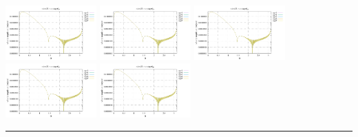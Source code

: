 \noindent
\includegraphics[width=3.5cm]{python_codes/fieldstone_152/RESULTS/exp2/vel_64_m2}
\includegraphics[width=3.5cm]{python_codes/fieldstone_152/RESULTS/exp2/vel_64_m3}
\includegraphics[width=3.5cm]{python_codes/fieldstone_152/RESULTS/exp2/vel_64_m4}
\includegraphics[width=3.5cm]{python_codes/fieldstone_152/RESULTS/exp2/vel_64_m5}
\includegraphics[width=3.5cm]{python_codes/fieldstone_152/RESULTS/exp2/vel_64_m6}

\hrule

